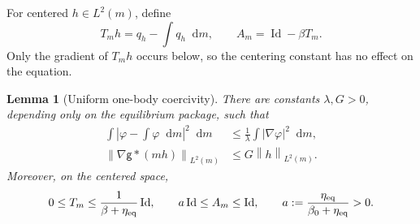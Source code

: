 \documentclass[11pt,reqno]{amsart}
\numberwithin{equation}{section}
\newtheorem{lemma}[lemma]{Lemma}
\theoremstyle{definition}
\theoremstyle{remark}
\newcommand{\g}{\mathsf g}
\newcommand{\Id}{\operatorname{Id}}
\newcommand{\dd}{\mathop{}\!\mathrm d}
\newcommand{\norm}[1]{\left\lVert#1\right\rVert}
\begin{document}
For centered $h\in L^2(m)$, define
\begin{equation}\label{eq:confined-response-operators}
 T_mh=q_h-\int q_h\dd m,\qquad A_m=\Id-\beta T_m.
\end{equation}
Only the gradient of $T_mh$ occurs below, so the centering constant has no effect on the equation.

\begin{lemma}[Uniform one-body coercivity]\label{lem:confined-linear-coercivity}
There are constants $\lambda,G>0$, depending only on the equilibrium package, such that
\begin{align}
 \int\left|\varphi-\int\varphi\dd m\right|^2\dd m
 &\leq\frac1\lambda\int|\nabla\varphi|^2\dd m,
 \label{eq:confined-poincare}\\
 \norm{\nabla\g*(mh)}_{L^2(m)}&\leq G\norm h_{L^2(m)}.
 \label{eq:confined-schur}
\end{align}
Moreover, on the centered space,
\begin{equation}\label{eq:confined-A-gap}
 0\leq T_m\leq\frac1{\beta+\eta_{\rm eq}}\Id,
 \qquad a\Id\leq A_m\leq\Id,
 \qquad a:=\frac{\eta_{\rm eq}}{\beta_0+\eta_{\rm eq}}>0.
\end{equation}
\end{lemma}
\end{document}
